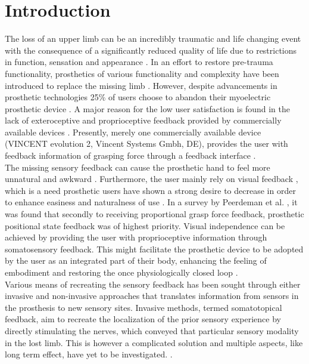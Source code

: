\chapter{Introduction}

The loss of an upper limb can be an incredibly traumatic and life changing event with the consequence of a significantly reduced quality of life due to restrictions in function, sensation and appearance \cite{Schofield2014,Ostlie2011}. 
In an effort to restore pre-trauma functionality, prosthetics of various functionality and complexity have been introduced to replace the missing limb \cite{Geethanjali2016}. However, despite advancements in prosthetic technologies 25\% of users choose to abandon their myoelectric prosthetic device \cite{Biddiss2007a}. A major reason for the low user satisfaction is found in the lack of exteroceptive and proprioceptive feedback provided by commercially available devices \cite{Schofield2014,Peerdeman2011}. Presently, merely one commercially available device (VINCENT evolution 2, Vincent Systems Gmbh, DE), provides the user with feedback information of grasping force through a feedback interface \cite{Systems2005}. \\    
%
The missing sensory feedback can cause the prosthetic hand to feel more unnatural and awkward \cite{Pamungkas2015}. Furthermore, the user mainly rely on visual feedback \cite{Pamungkas2015,Stephens-Fripp2018}, which is a need prosthetic users have shown a strong desire to decrease in order to enhance easiness and naturalness of use \cite{Atkins1996}.
In a survey by Peerdeman et al. \cite{Peerdeman2011}, it was found that secondly to receiving proportional grasp force feedback, prosthetic positional state feedback was of highest priority. Visual independence can be achieved by providing the user with proprioceptive information through somatosensory feedback. This might facilitate the prosthetic device to be adopted by the user as an integrated part of their body, enhancing the feeling of embodiment and restoring the once physiologically closed loop \cite{Stephens-Fripp2018,Xu2016,Strbac2016,Geng2012}. \\
%
Various means of recreating the sensory feedback has been sought through either invasive and non-invasive approaches that translates information from sensors in the prosthesis to new sensory sites. Invasive methods, termed somatotopical feedback, aim to recreate the localization of the prior sensory experience by directly stimulating the nerves, which conveyed that particular sensory modality in the lost limb. This is however a complicated solution and multiple aspects, like long term effect, have yet to be investigated. \cite{Schofield2014,Stephens-Fripp2018}. 
